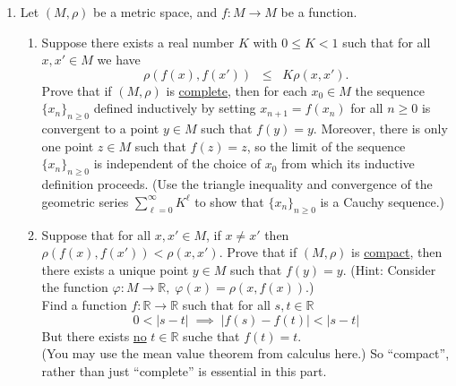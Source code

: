 \documentclass[11pt]{article}
\begin{document}
  \begin{enumerate}
    \item Let \((M, \rho)\) be a metric space, and \(f \colon M \to M\) be a function.
      \begin{enumerate}[label=(\alph*)]
        \item Suppose there exists a real number \(K\) with \(0 \leq K < 1\) such that for all \(x, x' \in M\) we have 
          \[\rho\left(f(x), f(x')\right) \;\;\leq\;\; K\rho(x,x').\]
          Prove that if \((M, \rho)\) is \underline{complete}, then for each \(x_0 \in M\) the sequence 
          \(\{x_n\}_{n \geq 0}\) defined inductively by setting \(x_{n+1} = f(x_n)\) for all \(n \geq 0\) is convergent 
          to a point \(y \in M\) such that \(f(y) = y\).  Moreover, there is only one point \(z \in M\) such that 
          \(f(z) = z\), so the limit of the sequence \(\{x_n\}_{n \geq 0}\) is independent of the choice of \(x_0\) 
          from which its inductive definition proceeds.  (Use the triangle inequality and convergence of the geometric 
          series \(\displaystyle\sum_{\ell=0}^{\infty} K^\ell\) to show that \(\{x_n\}_{n \geq 0}\) is a Cauchy sequence.)

        \item Suppose that for all \(x,x' \in M\), if \(x \neq x'\) then \(\rho\left(f(x), f(x')\right) < \rho(x,x')\).
          Prove that if \((M, \rho)\) is \underline{compact}, then there exists a unique point \(y \in M\) such that 
          \(f(y) = y\).  (Hint: Consider the function \(\varphi \colon M \to \mathbb{R},\; \varphi(x) = 
          \rho\left(x,f(x)\right)\).) \\
          Find a function \(f \colon \mathbb{R} \to \mathbb{R}\) such that for all \(s,t \in \mathbb{R}\)
          \[0 < |s-t| \;\implies\; \left|f(s) - f(t)\right| < |s-t|\]
          But there exists \underline{no} \(t \in \mathbb{R}\) suche that \(f(t) = t\). \\
          (You may use the mean value theorem from calculus here.)  So ``compact'', rather than just ``complete'' is 
          essential in this part.
      \end{enumerate}
  \end{enumerate}
\end{document}
